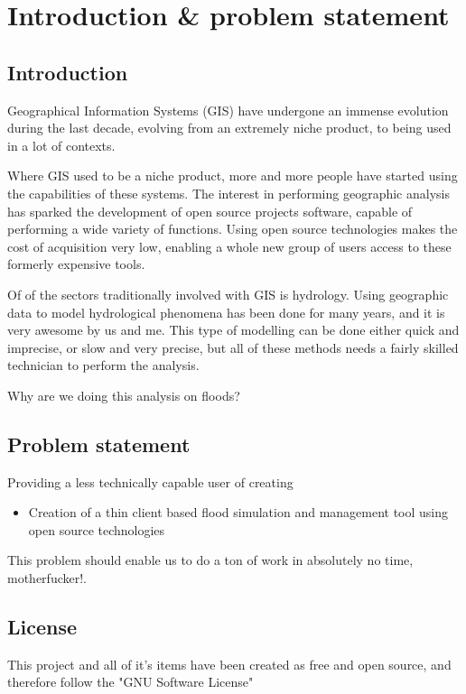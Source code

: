 
\chapter{Introduction \& problem statement} %

\label{ch:introduction} %


\section{Introduction}

Geographical Information Systems (GIS) have undergone an immense evolution during the last decade, evolving from an extremely niche product, to being used in a lot of contexts. 

Where GIS used to be a niche product, more and more people have started using the capabilities of these systems. The interest in performing geographic analysis has sparked the development of open source projects software, capable of performing a wide variety of functions. Using open source technologies makes the cost of acquisition very low, enabling a whole new group of users access to these formerly expensive tools.

Of of the sectors traditionally involved with GIS is hydrology. Using geographic data to model hydrological phenomena has been done for many years, and it is very awesome by us and me. This type of modelling can be done either quick and imprecise, or slow and very precise, but all of these methods needs a fairly skilled technician to perform the analysis. 


Why are we doing this analysis on floods?





\section{Problem statement}
Providing a less technically capable user of creating 

\begin{itemize}
\item Creation of a thin client based flood simulation and management tool using open source technologies
\end{itemize}

\noindent This problem should enable us to do a ton of work in absolutely no time, motherfucker!.


\section{License}

This project and all of it's items have been created as free and open source, and therefore follow the "GNU Software License"